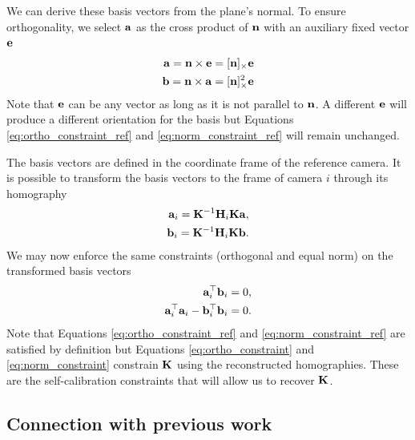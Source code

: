 \documentclass[10pt,twocolumn,letterpaper]{article}
\begin{document}
We can derive these basis vectors from the plane's normal. To ensure orthogonality, we select $\mathbf{a}$ as the cross product of $\mathbf{n}$ with an auxiliary fixed vector $\mathbf{e}$
\begin{align}
\mathbf{a} = \mathbf{n} \times \mathbf{e} = [\mathbf{n}]_\times \mathbf{e} \\
\mathbf{b} = \mathbf{n} \times \mathbf{a} = [\mathbf{n}]_\times^2 \mathbf{e}
\end{align}
Note that $\mathbf{e}$ can be any vector as long as it is not parallel to $\mathbf{n}$. A different $\mathbf{e}$ will produce a different orientation for the basis but Equations \eqref{eq:ortho_constraint_ref} and \eqref{eq:norm_constraint_ref} will remain unchanged.

The basis vectors are defined in the coordinate frame of the reference camera. It is possible to transform the basis vectors to the frame of camera $i$ through its homography
\begin{align}
\mathbf{a}_i = \mathbf{K}^{-1} \mathbf{H}_i \mathbf{K} \mathbf{a}, \\
\mathbf{b}_i = \mathbf{K}^{-1} \mathbf{H}_i \mathbf{K} \mathbf{b}.
\end{align}
%
We may now enforce the same constraints (orthogonal and equal norm) on the transformed basis vectors
\begin{align}
\mathbf{a}_i^\top \mathbf{b}_i = 0, \label{eq:ortho_constraint} \\
\mathbf{a}_i^\top \mathbf{a}_i - \mathbf{b}_i^\top \mathbf{b}_i = 0. \label{eq:norm_constraint} 
\end{align}
%
Note that Equations \eqref{eq:ortho_constraint_ref} and \eqref{eq:norm_constraint_ref} are satisfied by definition but Equations \eqref{eq:ortho_constraint} and \eqref{eq:norm_constraint} constrain $\mathbf{K}$ using the reconstructed homographies. These are the self-calibration constraints that will allow us to recover $\mathbf{K}$.

\subsection{Connection with previous work}
\label{sec:calib:connection}
\end{document}
